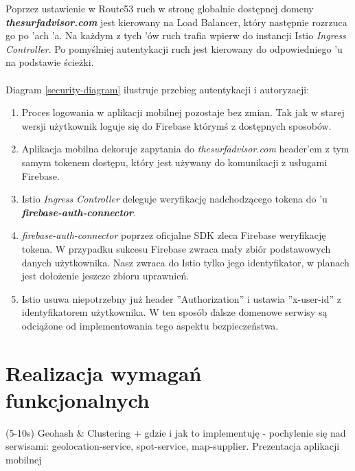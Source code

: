 Poprzez ustawienie w Route53 ruch w stronę globalnie dostępnej domeny \emph{\textbf{thesurfadvisor.com}} jest kierowany na Load Balancer, 
który następnie rozrzuca go po 'ach 'a.
Na każdym z tych 'ów ruch trafia wpierw do instancji Istio \emph{Ingress Controller}. 
Po pomyślniej autentykacji ruch jest kierowany do odpowiedniego 'u na podstawie ścieżki.
\\\\
Diagram \ref{security-diagram} ilustruje przebieg autentykacji i autoryzacji:
\begin{enumerate}
    \item
    Proces logowania w aplikacji mobilnej pozostaje bez zmian. Tak jak w starej wersji użytkownik loguje się do Firebase którymś z dostępnych sposobów.

    \item
    Aplikacja mobilna dekoruje zapytania do \emph{thesurfadvisor.com} header'em z tym samym tokenem dostępu, który jest używany do komunikacji z usługami Firebase.

    \item
    Istio \emph{Ingress Controller} deleguje weryfikację nadchodzącego tokena do 'u \textbf{\emph{firebase-auth-connector}}.

    \item
    \emph{firebase-auth-connector} poprzez oficjalne SDK zleca Firebase weryfikację tokena.
    W przypadku sukcesu Firebase zwraca mały zbiór podstawowych danych użytkownika.
    Nasz  zwraca do Istio tylko jego identyfikator, w planach jest dołożenie jeszcze zbioru uprawnień. 

    \item
    Istio usuwa niepotrzebny już header ''Authorization'' i ustawia ''x-user-id'' z identyfikatorem użytkownika.
    W ten sposób dalsze domenowe serwisy są odciążone od implementowania tego aspektu bezpieczeństwa.
\end{enumerate} 



\section{Realizacja wymagań funkcjonalnych}
(5-10s) Geohash \& Clustering + gdzie i jak to implementuję 
- pochylenie się nad serwisami: geolocation-service, spot-service, map-supplier. 
Prezentacja aplikacji mobilnej

